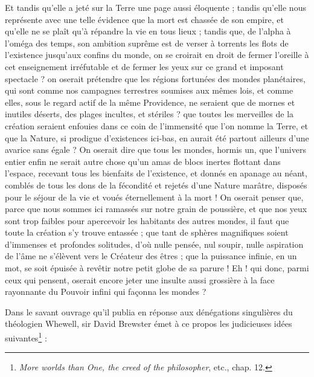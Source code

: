 \documentclass[a4paper, 11pt, oneside]{article}
\begin{document}
Et tandis qu'elle a jeté sur la Terre une page aussi éloquente ; tandis qu'elle nous représente avec une telle évidence que la mort est chassée de son empire, et qu'elle ne se plaît qu'à répandre la vie en tous lieux ; tandis que, de l'alpha à l'oméga des temps, son ambition suprême est de verser à torrents les flots de l'existence jusqu'aux confins du monde, on se croirait en droit de fermer l'oreille à cet enseignement irréfutable et de fermer les yeux sur ce grand et imposant spectacle ? on oserait prétendre que les régions fortunées des mondes planétaires, qui sont comme nos campagnes terrestres soumises aux mêmes lois, et comme elles, sous le regard actif de la même Providence, ne seraient que de mornes et inutiles déserts, des plages incultes, et stériles ? que toutes les merveilles de la création seraient enfouies dans ce coin de l'immensité que l'on nomme la Terre, et que la Nature, si prodigue d'existences ici-bas, en aurait été partout ailleurs d'une avarice sans égale ? On oserait dire que tous les mondes, hormis un, que l'univers entier enfin ne serait autre chose qu'un amas de blocs inertes flottant dans l'espace, recevant tous les bienfaits de l'existence, et donnés en apanage au néant, comblés de tous les dons de la fécondité et rejetés d'une Nature marâtre, disposés pour le séjour de la vie et voués éternellement à la mort ! On oserait penser que, parce que nous sommes ici ramassés sur notre grain de poussière, et que nos yeux sont trop faibles pour apercevoir les habitants des autres mondes, il faut que toute la création s'y trouve entassée ; que tant de sphères magnifiques soient d'immenses et profondes solitudes, d'où nulle pensée, nul soupir, nulle aspiration de l'âme ne s'élèvent vers le Créateur des êtres ; que la puissance infinie, en un mot, se soit épuisée à revêtir notre petit globe de sa parure ! Eh ! qui donc, parmi ceux qui pensent, oserait encore jeter une insulte aussi grossière à la face rayonnante du Pouvoir infini qui façonna les mondes ?

Dans le savant ouvrage qu'il publia en réponse aux dénégations singulières du théologien Whewell, sir David Brewster émet à ce propos les judicieuses idées suivantes\footnote{\emph{More worlds than One, the creed of the philosopher}, etc., chap. 12.} :
\end{document}

